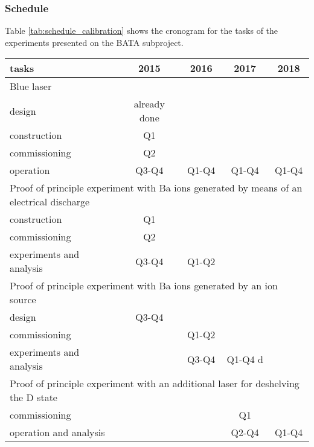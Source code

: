 

\subsubsection*{Schedule}

Table \ref{tab:schedule_calibration} shows the cronogram for the tasks of the experiments presented on the  BATA subproject. 

\begin{center}
\begin{tabular}{| l | c | c | c | c |}
\hline
tasks & 2015 & 2016 & 2017 & 2018 \\
\hline
\hline
\multicolumn{5}{|l|}{Blue laser}  \\
\hline
\hline
design & already done & & &  \\
construction & Q1 & & & \\
commissioning & Q2& & & \\
operation &  Q3-Q4 & Q1-Q4 &  Q1-Q4&  Q1-Q4\\
\hline
\hline
\multicolumn{5}{|l|}{Proof of principle experiment with Ba ions generated by means of an electrical discharge}  \\
\hline
\hline
construction  &  Q1 & & & \\
commissioning &  Q2 & & & \\
experiments and analysis &  Q3-Q4 & Q1-Q2& & \\
\hline
\hline
\multicolumn{5}{|l|}{Proof of principle experiment with Ba ions generated by an ion source}  \\
\hline
\hline
design & Q3-Q4 & & &  \\
commissioning  &  & Q1-Q2& & \\
experiments and analysis &  & Q3-Q4 & Q1-Q4 d& \\
\hline
\hline
\multicolumn{5}{|l|}{Proof of principle experiment with an additional laser for deshelving the D state}  \\
\hline
\hline
commissioning  &  &  & Q1 & \\
operation and analysis &  &  & Q2-Q4 & Q1-Q4 \\
\hline
\hline
\end{tabular}
\label{tab:schedule_calibration}
\end{center}

